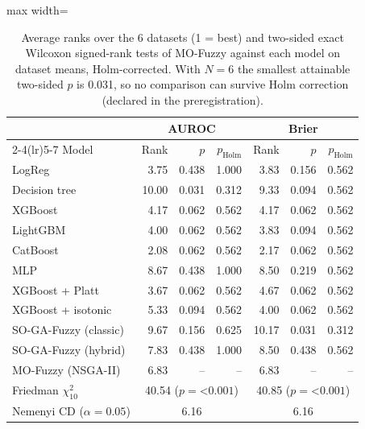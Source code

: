 \begin{table}[t]
\centering
\scriptsize
\setlength{\tabcolsep}{4pt}
\caption{Average ranks over the 6 datasets (1 = best) and two-sided exact Wilcoxon signed-rank tests of MO-Fuzzy against each model on dataset means, Holm-corrected. With $N=6$ the smallest attainable two-sided $p$ is 0.031, so no comparison can survive Holm correction (declared in the preregistration).}
\label{tab:ranks}
\begin{adjustbox}{max width=\linewidth}
\begin{tabular}{lrrrrrr}
\toprule
 & \multicolumn{3}{c}{AUROC} & \multicolumn{3}{c}{Brier} \\
\cmidrule(lr){2-4}\cmidrule(lr){5-7}
Model & Rank & $p$ & $p_{\mathrm{Holm}}$ & Rank & $p$ & $p_{\mathrm{Holm}}$ \\
\midrule
LogReg & 3.75 & 0.438 & 1.000 & 3.83 & 0.156 & 0.562 \\
Decision tree & 10.00 & 0.031 & 0.312 & 9.33 & 0.094 & 0.562 \\
XGBoost & 4.17 & 0.062 & 0.562 & 4.17 & 0.062 & 0.562 \\
LightGBM & 4.00 & 0.062 & 0.562 & 3.83 & 0.094 & 0.562 \\
CatBoost & 2.08 & 0.062 & 0.562 & 2.17 & 0.062 & 0.562 \\
MLP & 8.67 & 0.438 & 1.000 & 8.50 & 0.219 & 0.562 \\
XGBoost + Platt & 3.67 & 0.062 & 0.562 & 4.67 & 0.062 & 0.562 \\
XGBoost + isotonic & 5.33 & 0.094 & 0.562 & 4.00 & 0.062 & 0.562 \\
SO-GA-Fuzzy (classic) & 9.67 & 0.156 & 0.625 & 10.17 & 0.031 & 0.312 \\
SO-GA-Fuzzy (hybrid) & 7.83 & 0.438 & 1.000 & 8.50 & 0.438 & 0.562 \\
MO-Fuzzy (NSGA-II) & 6.83 & -- & -- & 6.83 & -- & -- \\
\midrule
Friedman $\chi^2_{10}$ & \multicolumn{3}{c}{40.54 ($p=$<$0.001$)} & \multicolumn{3}{c}{40.85 ($p=$<$0.001$)} \\
Nemenyi CD ($\alpha=0.05$) & \multicolumn{3}{c}{6.16} & \multicolumn{3}{c}{6.16} \\
\bottomrule
\end{tabular}
\end{adjustbox}
\end{table}
